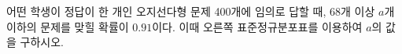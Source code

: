 \noindent\begin{minipage}[t]{0.58\linewidth}\vspace{0pt}\raggedright 어떤 학생이 정답이 한 개인 오지선다형 문제 400개에 임의로 답할 때, 68개 이상 $a$개 이하의 문제를 맞힐 확률이 $0.91$이다. 이때 오른쪽 표준정규분포표를 이용하여 $a$의 값을 구하시오. \end{minipage}\hfill\begin{minipage}[t]{0.4\linewidth}\vspace{0pt}\centering \resizebox{\ifdim\width>\linewidth\linewidth\else\width\fi}{!}{}\end{minipage}\par
